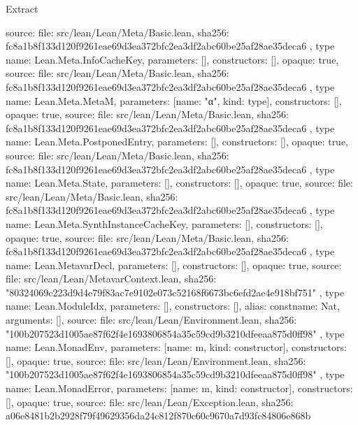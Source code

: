 \begin{lexlean}{Extract}
\begin{toolingmodule}
{{      source: {
        file: src/lean/Lean/Meta/Basic.lean,
        sha256: fc8a1b8f133d120f9261eae69d3ea372bfc2ea3df2abc60be25af28ae35deca6
      }
    },
    type{
      name: Lean.Meta.InfoCacheKey,
      parameters: [],
      constructors: [],
      opaque: true,
      source: {
        file: src/lean/Lean/Meta/Basic.lean,
        sha256: fc8a1b8f133d120f9261eae69d3ea372bfc2ea3df2abc60be25af28ae35deca6
      }
    },
    type{
      name: Lean.Meta.MetaM,
      parameters: [{name: "α", kind: type{}}],
      constructors: [],
      opaque: true,
      source: {
        file: src/lean/Lean/Meta/Basic.lean,
        sha256: fc8a1b8f133d120f9261eae69d3ea372bfc2ea3df2abc60be25af28ae35deca6
      }
    },
    type{
      name: Lean.Meta.PostponedEntry,
      parameters: [],
      constructors: [],
      opaque: true,
      source: {
        file: src/lean/Lean/Meta/Basic.lean,
        sha256: fc8a1b8f133d120f9261eae69d3ea372bfc2ea3df2abc60be25af28ae35deca6
      }
    },
    type{
      name: Lean.Meta.State,
      parameters: [],
      constructors: [],
      opaque: true,
      source: {
        file: src/lean/Lean/Meta/Basic.lean,
        sha256: fc8a1b8f133d120f9261eae69d3ea372bfc2ea3df2abc60be25af28ae35deca6
      }
    },
    type{
      name: Lean.Meta.SynthInstanceCacheKey,
      parameters: [],
      constructors: [],
      opaque: true,
      source: {
        file: src/lean/Lean/Meta/Basic.lean,
        sha256: fc8a1b8f133d120f9261eae69d3ea372bfc2ea3df2abc60be25af28ae35deca6
      }
    },
    type{
      name: Lean.MetavarDecl,
      parameters: [],
      constructors: [],
      opaque: true,
      source: {
        file: src/lean/Lean/MetavarContext.lean,
        sha256: "80324069c223d9d4e79f83ac7e9102e073c52168f6673bc6efd2ae4e918bf751"
      }
    },
    type{
      name: Lean.ModuleIdx,
      parameters: [],
      constructors: [],
      alias: const{name: Nat, arguments: []},
      source: {
        file: src/lean/Lean/Environment.lean,
        sha256: "100b207523d1005ae87f62f4e1693806854a35c59cd9b3210dfeeaa875d0ff98"
      }
    },
    type{
      name: Lean.MonadEnv,
      parameters: [{name: m, kind: constructor{}}],
      constructors: [],
      opaque: true,
      source: {
        file: src/lean/Lean/Environment.lean,
        sha256: "100b207523d1005ae87f62f4e1693806854a35c59cd9b3210dfeeaa875d0ff98"
      }
    },
    type{
      name: Lean.MonadError,
      parameters: [{name: m, kind: constructor{}}],
      constructors: [],
      opaque: true,
      source: {
        file: src/lean/Lean/Exception.lean,
        sha256: a06e8481b2b2928f79f49629356da24c812f870c60c9670a7d93fc84806e868b
}}}
\end{toolingmodule}
\end{lexlean}
